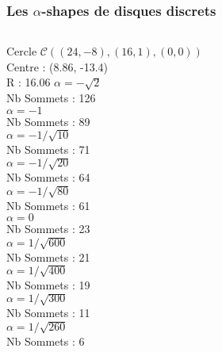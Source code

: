 
\begin{frame}
  \frametitle{Les $\alpha$-shapes de disques discrets}
 
  \begin{columns}[t]
    \begin{column}{4cm}
      \begin{exampleblock}{Cercle}
        $\mathcal{C} \left( (24,-8), (16,1), (0,0) \right)$\\
         
        {
          Centre : (8.86, -13.4)\\
          R : 16.06
        }
        {
          $\alpha = -\sqrt{2}$\\
           Nb Sommets : 126\\
        }
        {
          $\alpha = -1$\\
          Nb Sommets : 89\\
        }
        {
          $\alpha = -1/\sqrt{10}$\\
           Nb Sommets : 71\\
        }
        {
          $\alpha = -1/\sqrt{20}$\\
           Nb Sommets : 64\\
        }
        {
          $\alpha = -1/\sqrt{80}$\\
           Nb Sommets : 61\\
        }
        {
          $\alpha = 0$\\
           Nb Sommets : 23\\
        }
        {
          $\alpha = 1/\sqrt{600}$\\
           Nb Sommets : 21\\
        }
        {
          $\alpha = 1/\sqrt{400}$\\
           Nb Sommets : 19\\
        }
        {
          $\alpha = 1/\sqrt{300}$\\
           Nb Sommets : 11\\
        }
        {
          $\alpha = 1/\sqrt{260}$\\
           Nb Sommets : 6\\
        }
      \end{exampleblock}
     

\end{column}
\end{columns}
\end{frame}

